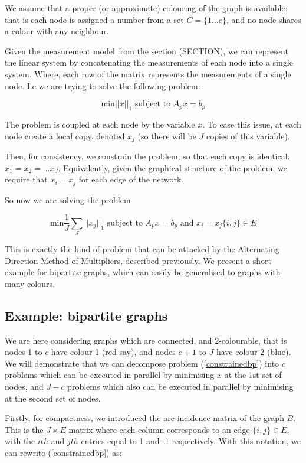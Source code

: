 \documentclass[titlepage]{article}
\begin{document}
We assume that a proper (or approximate) colouring of the graph is available: that is each node is assigned a number from a set \(C = \{1 \ldots c \} \), and no node shares a colour with any neighbour.

Given the measurement model from the section (SECTION), we can represent the linear system by concatenating the measurements of each node into a single system. Where, each row of the matrix represents the measurements of a single node. I.e we are trying to solve the following problem:

\begin{equation}
\text{min} ||x||_1 \text{ subject to } A_p x = b_p
\end{equation}

The problem is coupled at each node by the variable \(x\). To ease this issue, at each node create a local copy, denoted \(x_j\) (so there will be \(J\) copies of this variable). 

Then, for consistency, we constrain the problem, so that each copy is identical: \(x_1 = x_2 = \ldots x_J\). Equivalently, given the graphical structure of the problem, we require that \(x_i = x_j\) for each edge of the network.

So now we are solving the problem

\begin{equation}
\text{min} \frac{1}{J}\sum_J||x_j||_1 \text{ subject to } A_p x = b_p \text{ and } x_i = x_j \{i,j\} \in E 
 \label{constrainedbp}
\end{equation}
 
This is exactly the kind of problem that can be attacked by the Alternating Direction Method of Multipliers, described previously. We present a short example for bipartite graphs, which can easily be generalised to graphs with many colours. 
 
\subsection{Example: bipartite graphs}
We are here considering graphs which are connected, and 2-colourable, that is nodes 1 to \(c\) have colour 1 (red say), and nodes \(c+1\) to \(J\) have colour 2 (blue). We will demonstrate that we can decompose problem (\ref{constrainedbp}) into \(c\) problems which can be executed in parallel by minimising \(x\) at the 1st set of nodes, and \(J - c\) problems which also can be executed in parallel by minimising at the second set of nodes. 

Firstly, for compactness, we introduced the arc-incidence matrix of the graph \(B\). This is the \(J \times E\) matrix where each column corresponds to an edge \(\{i,j\} \in E\), with the \(ith\) and \(jth\) entries equal to 1 and -1 respectively. With this notation, we can rewrite (\ref{constrainedbp}) as:
\end{document}
